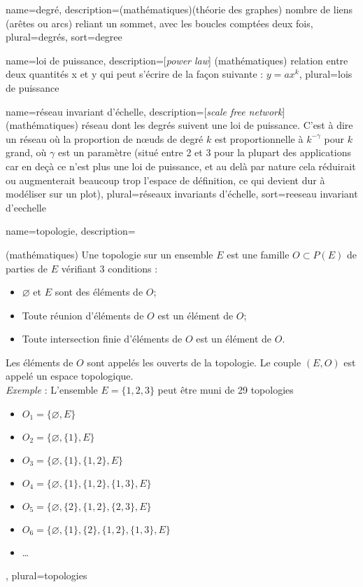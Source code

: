 {
	name={degr\'e},
	description={(mathématiques)(théorie des graphes) nombre de liens (arêtes ou arcs) reliant un sommet, avec les boucles comptées deux fois}, 
	plural={degr\'es},
	sort={degree}
}

{
	name={loi de puissance},
	description={[\textit{power law}] (mathématiques) relation entre deux quantités x et y qui peut s'écrire de la façon suivante : \(y=ax^{k}\)}, 
	plural={lois de puissance}
}

{
	name={r\'eseau invariant d'échelle},
	description={[\textit{scale free network}] (mathématiques) réseau dont les degrés suivent une loi de puissance. C'est à dire un réseau où la proportion de nœuds de degré $k$ est proportionnelle à $k^{-\gamma}$ pour $k$ grand, où $\gamma$ est un paramètre (situé entre 2 et 3 pour la plupart des applications car en deçà ce n'est plus une loi de puissance, et au delà par nature cela réduirait ou augmenterait beaucoup trop l'espace de définition, ce qui devient dur à modéliser sur un plot)}, 
	plural={r\'eseaux invariants d'échelle},
	sort={reeseau invariant d'eechelle}
}

{
	name={topologie},
	description={(mathématiques) Une topologie sur un ensemble $E$ est une famille $O \subset P(E)$ de parties de $E$ vérifiant 3 conditions : 
	\begin{itemize}
		\item $\varnothing$ et $E$ sont des éléments de $O$;
		\item Toute réunion d'éléments de $O$ est un élément de $O$;
		\item Toute intersection finie d'éléments de $O$ est un élément de $O$.
	\end{itemize}
	Les éléments de $O$ sont appelés les ouverts de la topologie. Le couple $(E, O)$ est appelé un espace topologique.\\\emph{Exemple} : L'ensemble $E=\{1,2,3\}$ peut être muni de 29 topologies
	\begin{itemize}
		\item $O_1 = \{\varnothing, E\}$
		\item $O_2 = \{\varnothing, \{1\}, E\}$
		\item $O_3 = \{\varnothing, \{1\}, \{1,2\}, E\}$
		\item $O_4 = \{\varnothing, \{1\}, \{1,2\}, \{1,3\}, E\}$
		\item $O_5 = \{\varnothing, \{2\}, \{1,2\}, \{2,3\}, E\}$
		\item $O_6 = \{\varnothing, \{1\}, \{2\}, \{1,2\}, \{1,3\}, E\}$
		\item \dots
	\end{itemize}},
	plural={topologies}
}

